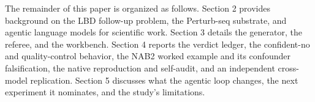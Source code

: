 The remainder of this paper is organized as follows. Section 2 provides background on the LBD follow-up
problem, the Perturb-seq substrate, and agentic language models for scientific work. Section 3 details the
generator, the referee, and the workbench. Section 4 reports the verdict ledger, the confident-no and
quality-control behavior, the NAB2 worked example and its confounder falsification, the native
reproduction and self-audit, and an independent cross-model replication. Section 5 discusses what the
agentic loop changes, the next experiment it nominates, and the study's limitations.
